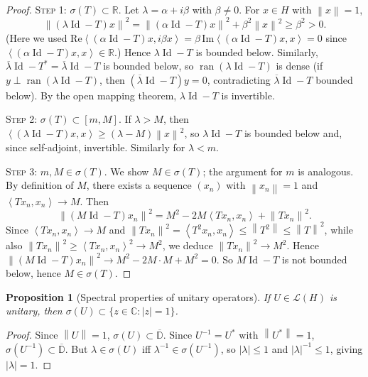 \documentclass[a4paper,12pt]{book}
\DeclareMathOperator{\Id}{Id}
\DeclareMathOperator{\ran}{ran}
\newcommand{\R}{\mathbb{R}}
\newcommand{\C}{\mathbb{C}}
\newcommand{\norm}[1]{\left\| #1 \right\|}
\newcommand{\abs}[1]{\left| #1 \right|}
\newcommand{\inner}[2]{\left\langle #1, #2 \right\rangle}
\theoremstyle{definition}
\theoremstyle{plain}
\newtheorem{proposition}[definition]{Proposition}
\theoremstyle{remark}
\begin{document}
\begin{proof}
\textsc{Step 1: $\sigma(T)\subset\R$.}
Let $\lambda = \alpha + i\beta$ with $\beta\neq 0$. For $x\in H$ with $\norm{x}=1$,
\[
  \norm{(\lambda\Id-T)x}^2
  = \norm{(\alpha\Id-T)x}^2 + \beta^2\norm{x}^2
  \geq \beta^2 > 0.
\]
(Here we used $\mathrm{Re}\inner{(\alpha\Id-T)x}{i\beta x}
= \beta\,\mathrm{Im}\inner{(\alpha\Id-T)x}{x}=0$ since
$\inner{(\alpha\Id-T)x}{x}\in\R$.)
Hence $\lambda\Id-T$ is bounded below. Similarly, $\overline{\lambda}\Id-T^*
= \overline{\lambda}\Id-T$ is bounded below, so
$\ran(\lambda\Id-T)$ is dense (if $y\perp\ran(\lambda\Id-T)$, then
$(\overline{\lambda}\Id-T)y=0$, contradicting $\overline{\lambda}\Id-T$
bounded below). By the open mapping theorem, $\lambda\Id-T$ is invertible.

\textsc{Step 2: $\sigma(T)\subset[m,M]$.}
If $\lambda>M$, then $\inner{(\lambda\Id-T)x}{x}\geq(\lambda-M)\norm{x}^2$,
so $\lambda\Id-T$ is bounded below and, since self-adjoint, invertible. Similarly
for $\lambda<m$.

\textsc{Step 3: $m,M\in\sigma(T)$.}
We show $M\in\sigma(T)$; the argument for $m$ is analogous. By definition of
$M$, there exists a sequence $(x_n)$ with $\norm{x_n}=1$ and
$\inner{Tx_n}{x_n}\to M$. Then
\[
  \norm{(M\Id-T)x_n}^2
  = M^2 - 2M\inner{Tx_n}{x_n} + \norm{Tx_n}^2.
\]
Since $\inner{Tx_n}{x_n}\to M$ and
$\norm{Tx_n}^2 = \inner{T^2 x_n}{x_n}\leq\norm{T^2}\leq\norm{T}^2$, while
also $\norm{Tx_n}^2\geq\inner{Tx_n}{x_n}^2\to M^2$, we deduce
$\norm{Tx_n}^2\to M^2$. Hence $\norm{(M\Id-T)x_n}^2\to M^2-2M\cdot M+M^2=0$.
So $M\Id-T$ is not bounded below, hence $M\in\sigma(T)$.
\end{proof}

\begin{proposition}[Spectral properties of unitary operators]
\label{prop:unitary-spectrum}
If $U\in\mathcal{L}(H)$ is unitary, then $\sigma(U)\subset\{z\in\C:\abs{z}=1\}$.
\end{proposition}

\begin{proof}
Since $\norm{U}=1$, $\sigma(U)\subset\overline{\mathbb{D}}$. Since $U^{-1}=U^*$
with $\norm{U^*}=1$, $\sigma(U^{-1})\subset\overline{\mathbb{D}}$. But
$\lambda\in\sigma(U)$ iff $\lambda^{-1}\in\sigma(U^{-1})$, so
$\abs{\lambda}\leq 1$ and $\abs{\lambda}^{-1}\leq 1$, giving $\abs{\lambda}=1$.
\end{proof}
\end{document}
